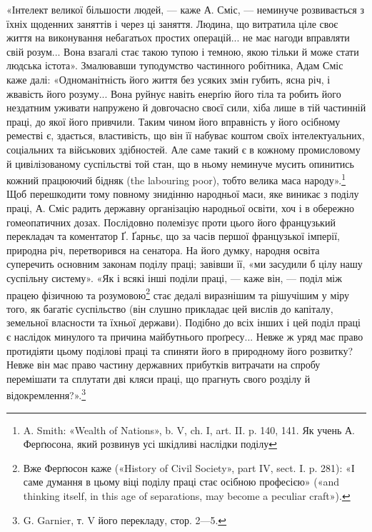 «Інтелект великої більшости людей, — каже А. Сміс, — неминуче
розвивається з їхніх щоденних заняттів і через ці заняття.
Людина, що витратила ціле своє життя на виконування небагатьох
простих операцій... не має нагоди вправляти свій розум... Вона
взагалі стає такою тупою і темною, якою тільки й може стати
людська істота». Змалювавши туподумство частинного робітника,
Адам Сміс каже далі: «Одноманітність його життя без усяких
змін губить, ясна річ, і жвавість його розуму... Вона руйнує
навіть енерґію його тіла та робить його нездатним уживати напружено
й довгочасно своєї сили, хіба лише в тій частинній
праці, до якої його привчили. Таким чином його вправність у його
осібному реместві є, здається, властивість, що він її набуває коштом
своїх інтелектуальних, соціальних та військових здібностей.
Але саме такий є в кожному промисловому й цивілізованому
суспільстві той стан, що в ньому неминуче мусить опинитись
кожний працюючий бідняк (the labouring poor), тобто велика маса
народу».\footnote{
A. Smith: «Wealth of Nations», b. V, ch. I, art. II. p. 140, 141.
Як учень А. Ферґюсона, який розвинув усі шкідливі наслідки поділу
} Щоб перешкодити тому повному знидінню народньої
маси, яке виникає з поділу праці, А. Сміс радить державну
організацію народньої освіти, хоч і в обережно гомеопатичних
дозах. Послідовно полемізує проти цього його французький
перекладач та коментатор Ґ. Ґарньє, що за часів першої французької
імперії, природна річ, перетворився на сенатора. На його
думку, народня освіта суперечить основним законам поділу праці;
завівши її, «ми засудили б цілу нашу суспільну систему». «Як
і всякі інші поділи праці, — каже він, — поділ між працею фізичною
та розумовою\footnote{
Вже Ферґюсон каже («History of Civil Society», part IV, sect. I.
p. 281): «І саме думання в цьому віці поділу праці стає осібною професією»
(«and thinking itself, in this age of separations, may become a peculiar
craft»).
} стає дедалі виразнішим та рішучішим у
міру того, як багатіє суспільство (він слушно прикладає цей
вислів до капіталу, земельної власности та їхньої держави).
Подібно до всіх інших і цей поділ праці є наслідок минулого та
причина майбутнього проґресу... Невже ж уряд має право протидіяти
цьому поділові праці та спиняти його в природному його
розвитку? Невже він має право частину державних прибутків
витрачати на спробу перемішати та сплутати дві кляси праці,
що прагнуть свого розділу й відокремлення?».\footnote{
G. Garnier, т. V його перекладу, стор. 2—5.
}

